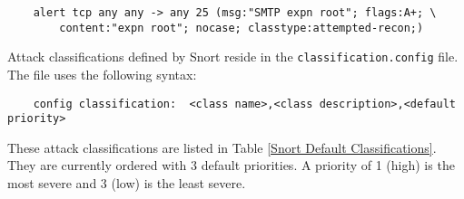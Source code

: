 \documentclass[english]{report}
\begin{document}
\begin{verbatim}
    alert tcp any any -> any 25 (msg:"SMTP expn root"; flags:A+; \
        content:"expn root"; nocase; classtype:attempted-recon;)
\end{verbatim}

Attack classifications defined by Snort reside in the
\texttt{classification.config} file. The file uses the following syntax:

\begin{verbatim}
    config classification:  <class name>,<class description>,<default priority>
\end{verbatim}

These attack classifications are listed in Table \ref{Snort Default
Classifications}. They are currently ordered with 3 default priorities. A
priority of 1 (high) is the most severe and 3 (low) is the least severe.
\end{document}
